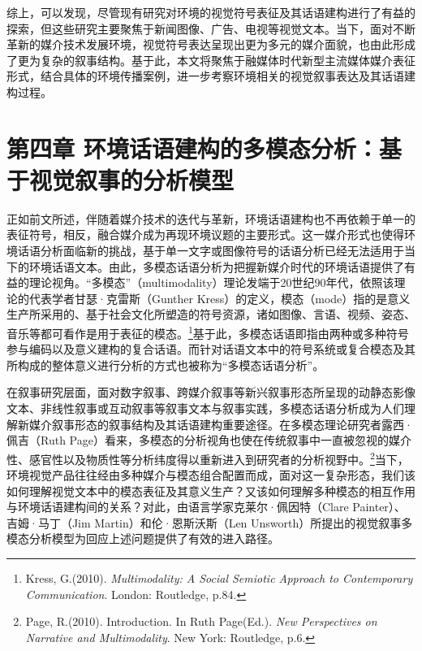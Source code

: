 综上，可以发现，尽管现有研究对环境的视觉符号表征及其话语建构进行了有益的探索，但这些研究主要聚焦于新闻图像、广告、电视等视觉文本。当下，面对不断革新的媒介技术发展环境，视觉符号表达呈现出更为多元的媒介面貌，也由此形成了更为复杂的叙事结构。基于此，本文将聚焦于融媒体时代新型主流媒体媒介表征形式，结合具体的环境传播案例，进一步考察环境相关的视觉叙事表达及其话语建构过程。

\section{第四章
环境话语建构的多模态分析：基于视觉叙事的分析模型}\label{ux7b2cux56dbux7ae0-ux73afux5883ux8bddux8bedux5efaux6784ux7684ux591aux6a21ux6001ux5206ux6790ux57faux4e8eux89c6ux89c9ux53d9ux4e8bux7684ux5206ux6790ux6a21ux578b}

正如前文所述，伴随着媒介技术的迭代与革新，环境话语建构也不再依赖于单一的表征符号，相反，融合媒介成为再现环境议题的主要形式。这一媒介形式也使得环境话语分析面临新的挑战，基于单一文字或图像符号的话语分析已经无法适用于当下的环境话语文本。由此，多模态话语分析为把握新媒介时代的环境话语提供了有益的理论视角。``多模态''（multimodality）理论发端于20世纪90年代，依照该理论的代表学者甘瑟·克雷斯（Gunther
Kress）的定义，模态（mode）指的是意义生产所采用的、基于社会文化所塑造的符号资源，诸如图像、言语、视频、姿态、音乐等都可看作是用于表征的模态。\footnote{Kress,
  G.(2010). \emph{Multimodality: A Social Semiotic Approach to
  Contemporary Communication}. London: Routledge, p.84.}基于此，多模态话语即指由两种或多种符号参与编码以及意义建构的复合话语。而针对话语文本中的符号系统或复合模态及其所构成的整体意义进行分析的方式也被称为``多模态话语分析''。

在叙事研究层面，面对数字叙事、跨媒介叙事等新兴叙事形态所呈现的动静态影像文本、非线性叙事或互动叙事等叙事文本与叙事实践，多模态话语分析成为人们理解新媒介叙事形态的叙事结构及其话语建构重要途径。在多模态理论研究者露西·佩吉（Ruth
Page）看来，多模态的分析视角也使在传统叙事中一直被忽视的媒介性、感官性以及物质性等分析纬度得以重新进入到研究者的分析视野中。\footnote{Page,
  R.(2010). Introduction. In Ruth Page(Ed.). \emph{New Perspectives on
  Narrative and Multimodality}. New York: Routledge, p.6.}当下，环境视觉产品往往经由多种媒介与模态组合配置而成，面对这一复杂形态，我们该如何理解视觉文本中的模态表征及其意义生产？又该如何理解多种模态的相互作用与环境话语建构间的关系？对此，由语言学家克莱尔·佩因特（Clare
Painter）、吉姆·马丁（Jim Martin）和伦·恩斯沃斯（Len
Unsworth）所提出的视觉叙事多模态分析模型为回应上述问题提供了有效的进入路径。

